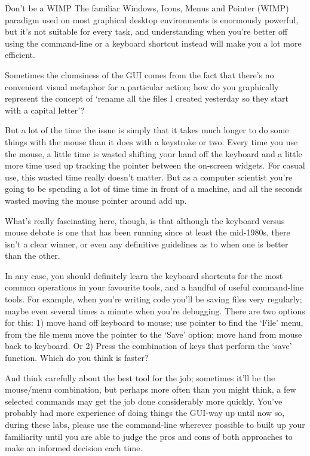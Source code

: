 \begin{diversion}{Don't be a WIMP}
\label{breakout:wimp}
The familiar Windows, Icons, Menus and Pointer (WIMP) paradigm used on most graphical desktop environments is enormously powerful, but it's not suitable for every task, and understanding when you're better off using the command-line or a keyboard shortcut instead will make you a lot more efficient.

Sometimes the clumsiness of the GUI comes from the fact that there's no convenient visual metaphor for a particular action; how do you graphically represent the concept of `rename all the files I created yesterday so they start with a capital letter'?

But a lot of the time the issue is simply that it takes much longer to do some things with the mouse than it does with a keystroke or two. Every time you use the mouse, a little time is wasted shifting your hand off the keyboard and a little more time used up tracking the pointer between the on-screen widgets. For casual use, this wasted time really doesn't matter. But as a computer scientist you're going to be spending a lot of time time in front of a machine, and all the seconds wasted moving the mouse pointer around add up.

What's really fascinating here, though, is that although the keyboard versus mouse debate is one that has been running since at least the mid-1980s, there isn't a clear winner, or even any definitive guidelines as to when one is better than the other.

In any case, you should definitely learn the keyboard shortcuts for the most common operations in your favourite tools, and a handful of useful command-line tools. For example, when you're writing code you'll be saving files very regularly; maybe even several times a minute when you're debugging. There are two options for this: 1) move hand off keyboard to mouse; use pointer to find the `File' menu, from the file menu move the pointer to the `Save' option; move hand from mouse back to keyboard. Or 2) Press the combination of keys that perform the `save' function. Which do you think is faster?

And think carefully about the best tool for the job; sometimes it'll be the mouse/menu combination, but perhaps more often than you might think, a few selected commands may get the job done considerably more quickly. You've probably had more experience of doing things the GUI-way up until now so, during these labs,  please use the command-line wherever possible to built up your familiarity until you are able to judge the pros and cons of both approaches to make an informed decision each time.

\end{diversion}

